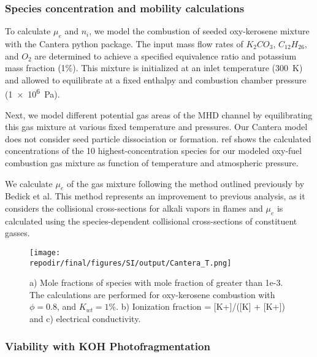 \subsubsection{Species concentration and mobility calculations}\label{section:species_concentration_mobility_calc}

To calculate $\mu_e$ and $n_i$, we model the combustion of seeded oxy-kerosene mixture with the Cantera python package. The input mass flow rates of $K_2CO_3$, $C_{12}H_{26}$, and $O_2$ are determined to achieve a specified equivalence ratio and potassium mass fraction (1\%). This mixture is initialized at an inlet temperature (\SI{300}{\kelvin}) and allowed to equilibrate at a fixed enthalpy and combustion chamber pressure (\SI{1e6}{\pascal}).

Next, we model different potential gas areas of the MHD channel by equilibrating this gas mixture at various fixed temperature and pressures. Our Cantera model does not consider seed particle dissociation or formation. ref shows the calculated concentrations of the 10 highest-concentration species for our modeled oxy-fuel combustion gas mixture as function of temperature and atmospheric pressure.%

We calculate $\mu_e$ of the gas mixture following the method outlined previously by Bedick et al.\cite{bedickCombustionPlasmaElectrical2017a} This method represents an improvement to previous analysis, as it considers the collisional cross-sections for alkali vapors in flames and $\mu_e$ is calculated using the species-dependent collisional cross-sections of constituent gasses.


\begin{figure}[ht]
    \centering
    \texttt{[image: \\repodir/final/figures/SI/output/Cantera\_T.png]}
    \caption{a) Mole fractions of species with mole fraction of greater than 1e-3. The calculations are performed for oxy-kerosene combustion with \(\phi = 0.8\), and \(K_{wt} = 1\%\). b) Ionization fraction = {[}K+{]}/({[}K{]} + {[}K+{]}) and c) electrical conductivity.}
    \label{fig:SI_Cantera_T}
\end{figure} 


\hypertarget{photoionization}{%
\subsubsection{Viability with KOH Photofragmentation}\label{photoionization}}

